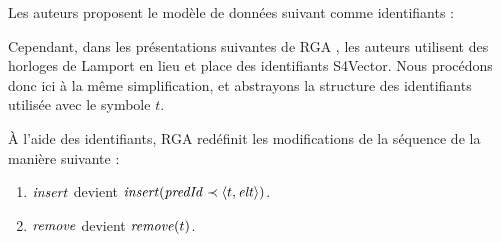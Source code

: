Les auteurs proposent le modèle de données suivant comme identifiants :

\noindent{}

Cependant, dans les présentations suivantes de \ac{RGA} \cite{shapiro_2011_crdt, 2016-specification-complexity-collaborative-text-editing-attiya}, les auteurs utilisent des horloges de Lamport \cite{1978-happen-before-lamport} en lieu et place des identifiants S4Vector.
Nous procédons donc ici à la même simplification, et abstrayons la structure des identifiants utilisée avec le symbole $t$.

À l'aide des identifiants, \ac{RGA} redéfinit les modifications de la séquence de la manière suivante :
\begin{enumerate}
  \item $\mathit{insert}$ devient $\mathit{insert}(\mathit{predId} \prec \langle t,\mathit{elt} \rangle)$.
  \item $\mathit{remove}$ devient $\mathit{remove}(t)$.
\end{enumerate}

